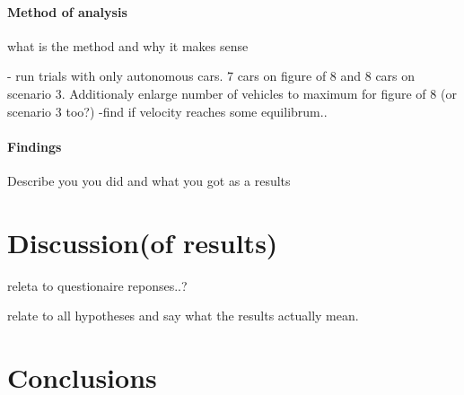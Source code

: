 \documentclass[11pt,english]{article}
\begin{document}
\paragraph{Method of analysis}

what is the method and why it makes sense

- run trials with only autonomous cars. 7 cars on figure of 8 and 8 cars on scenario 3.
Additionaly enlarge number of vehicles to maximum for figure of 8 (or scenario 3 too?)
-find if velocity reaches some equilibrum..

\paragraph{Findings}

Describe you you did and what you got as a results






\section{Discussion(of results)}

releta to questionaire reponses..?

relate to all hypotheses and say what the results actually mean.



\section{Conclusions}


















\end{document}
